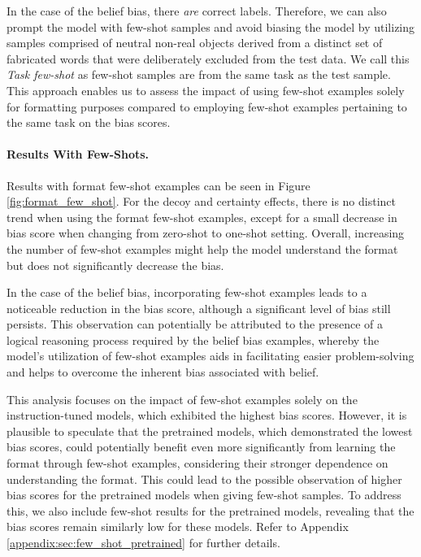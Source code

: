 In the case of the belief bias, there \emph{are} correct labels.
Therefore, we can also prompt the model with few-shot samples and avoid biasing the model by utilizing samples comprised of neutral non-real objects derived from a distinct set of fabricated words that were deliberately excluded from the test data.
We call this \textit{Task few-shot} as few-shot samples are from the same task as the test sample.
This approach enables us to assess the impact of using few-shot examples solely for formatting purposes compared to employing few-shot examples pertaining to the same task on the bias scores.


\paragraph{Results With Few-Shots.}
Results with format few-shot examples can be seen in Figure \ref{fig:format_few_shot}.
For the decoy and certainty effects, there is no distinct trend when using the format few-shot examples, except for a small decrease in bias score when changing from zero-shot to one-shot setting.
Overall, increasing the number of few-shot examples might help the model understand the format but does not significantly decrease the bias.


In the case of the belief bias, incorporating few-shot examples leads to a noticeable reduction in the bias score, although a significant level of bias still persists.
This observation can potentially be attributed to the presence of a logical reasoning process required by the belief bias examples, whereby the model's utilization of few-shot examples aids in facilitating easier problem-solving and helps to overcome the inherent bias associated with belief.

This analysis focuses on the impact of few-shot examples solely on the instruction-tuned models, which exhibited the highest bias scores.
However, it is plausible to speculate that the pretrained models, which demonstrated the lowest bias scores, could potentially benefit even more significantly from learning the format  through few-shot examples, considering their stronger dependence on understanding the format.
This could lead to the possible observation of higher bias scores for the pretrained models when giving few-shot samples.
To address this, we also include few-shot results for the pretrained models, revealing that the bias scores remain similarly low for these models.
Refer to Appendix \ref{appendix:sec:few_shot_pretrained} for further details.

